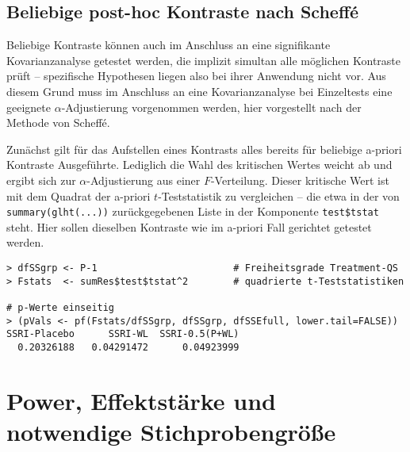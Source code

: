 \subsection{Beliebige post-hoc Kontraste nach Scheffé}

Beliebige Kontraste können auch im Anschluss an eine signifikante Kovarianzanalyse getestet werden, die implizit simultan alle möglichen Kontraste prüft -- spezifische Hypothesen liegen also bei ihrer Anwendung nicht vor. Aus diesem Grund muss im Anschluss an eine Kovarianzanalyse bei Einzeltests eine geeignete $\alpha$-Adjustierung vorgenommen werden, hier vorgestellt nach der Methode von Scheffé.

Zunächst gilt für das Aufstellen eines Kontrasts alles bereits für beliebige a-priori Kontraste Ausgeführte. Lediglich die Wahl des kritischen Wertes weicht ab und ergibt sich zur $\alpha$-Adjustierung aus einer $F$-Verteilung. Dieser kritische Wert ist mit dem Quadrat der a-priori $t$-Teststatistik zu vergleichen -- die etwa in der von \lstinline!summary(glht(...))! zurückgegebenen Liste in der Komponente \lstinline!test$tstat! steht. Hier sollen dieselben Kontraste wie im a-priori Fall gerichtet getestet werden.
\begin{lstlisting}
> dfSSgrp <- P-1                        # Freiheitsgrade Treatment-QS
> Fstats  <- sumRes$test$tstat^2        # quadrierte t-Teststatistiken

# p-Werte einseitig
> (pVals <- pf(Fstats/dfSSgrp, dfSSgrp, dfSSEfull, lower.tail=FALSE))
SSRI-Placebo      SSRI-WL  SSRI-0.5(P+WL)
  0.20326188   0.04291472      0.04923999
\end{lstlisting}

\section{Power, Effektstärke und notwendige Stichprobengröße}
\label{sec:power}

